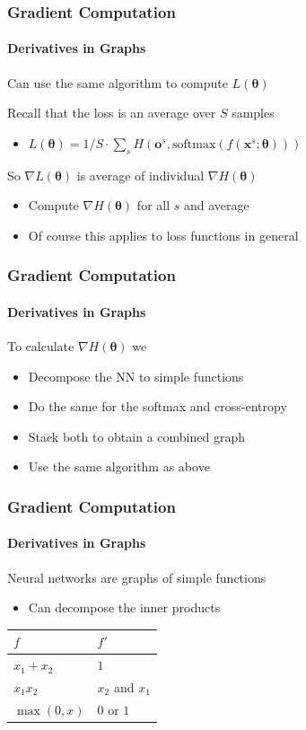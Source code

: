 \documentclass[xetex,professionalfont]{beamer}
\renewcommand{\vec}[1]{\ensuremath{\mathbf{#1}}}
\newcommand{\vx}{\vec{x}}
\newcommand{\vo}{\vec{o}}
\newcommand{\bth}{\boldsymbol{\theta}}
\begin{document}
\begin{frame}
\frametitle{Gradient Computation}
\framesubtitle{Derivatives in Graphs}

Can use the same algorithm to compute $L(\bth)$

\bigskip

Recall that the loss is an average over $S$ samples
\begin{itemize}
    \item $L(\bth)=1/S\cdot\sum_s H(\vo^s,\text{softmax}(f(\vx^s;\bth)))$
\end{itemize}

\bigskip

So $\nabla L(\bth)$ is average of individual $\nabla H(\bth)$
\begin{itemize}
    \item Compute $\nabla H(\bth)$ for all $s$ and average
    \item Of course this applies to loss functions in general
\end{itemize}

\end{frame}


\begin{frame}
\frametitle{Gradient Computation}
\framesubtitle{Derivatives in Graphs}

To calculate $\nabla H(\bth)$ we
\begin{itemize}
    \item Decompose the NN to simple functions
    \item Do the same for the softmax and cross-entropy
    \item Stack both to obtain a combined graph
    \item Use the same algorithm as above
\end{itemize}

\end{frame}


\begin{frame}
\frametitle{Gradient Computation}
\framesubtitle{Derivatives in Graphs}

Neural networks are graphs of simple functions
\begin{itemize}
    \item Can decompose the inner products %
\end{itemize}

\bigskip

\begin{center}
\begin{tabular}{ll} \toprule
$f$ & $f'$ \\ \midrule
$x_1+x_2$ & $1$ \\
$x_1x_2$ & $x_2$ and $x_1$ \\ %
$\max(0,x)$ & $0$ or $1$ \\ \bottomrule %
\end{tabular}
\end{center}

\end{frame}
\end{document}
